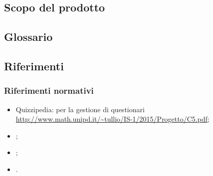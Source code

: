 \documentclass[a4paper, titlepage]{article}
\begin{document}
\subsection{Scopo del prodotto}
\SCOPO

\subsection{Glossario}
\GLOSSARIO

\subsection{Riferimenti}
\subsubsection{Riferimenti normativi}
\begin{itemize}
\item {} Quizzipedia:  per la gestione di questionari
\newline \url{http://www.math.unipd.it/~tullio/IS-1/2015/Progetto/C5.pdf};
\item {} \NdPdoc;
\item {} \ARdoc;
\item {} \PdPdoc.
\end{itemize}
\end{document}
